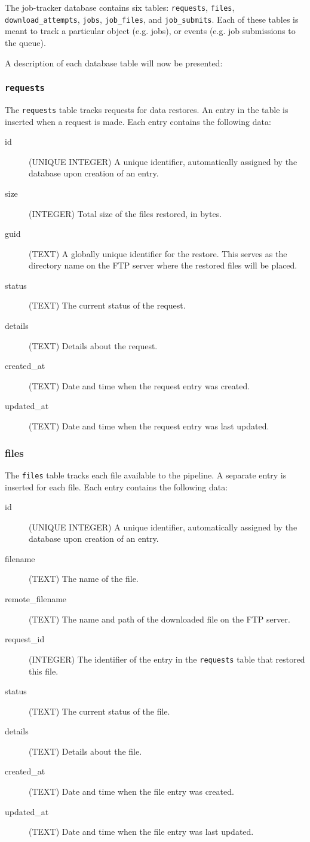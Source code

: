 The job-tracker database contains six tables: \texttt{requests}, \texttt{files}, \texttt{download\_attempts}, \texttt{jobs}, \texttt{job\_files}, and \texttt{job\_submits}. Each of these tables is meant to track a particular object (e.g. jobs), or events (e.g. job submissions to the queue).

A description of each database table will now be presented:

\subsubsection{\texttt{requests}}
The \texttt{requests} table tracks requests for data restores. An entry in the table is inserted when a request is made. Each entry contains the following data:
\begin{description}
    \item[id] (UNIQUE INTEGER) A unique identifier, automatically assigned by the database upon creation of an entry.
    \item[size] (INTEGER) Total size of the files restored, in bytes.
    \item[guid] (TEXT) A globally unique identifier for the restore. This serves as the directory name on the FTP server where the restored files will be placed.
    \item[status] (TEXT) The current status of the request.
    \item[details] (TEXT) Details about the request.
    \item[created\_at] (TEXT) Date and time when the request entry was created.
    \item[updated\_at] (TEXT) Date and time when the request entry was last updated.
\end{description}

\subsubsection{files}
The \texttt{files} table tracks each file available to the pipeline. A separate entry is inserted for each file. Each entry contains the following data:

\begin{description}
    \item[id] (UNIQUE INTEGER)  A unique identifier, automatically assigned by the database upon creation of an entry.
    \item[filename] (TEXT) The name of the file.
    \item[remote\_filename] (TEXT) The name and path of the downloaded file on the FTP server.
    \item[request\_id] (INTEGER) The identifier of the entry in the \texttt{requests} table that restored this file.
    \item[status] (TEXT) The current status of the file.
    \item[details] (TEXT) Details about the file.
    \item[created\_at] (TEXT) Date and time when the file entry was created.
    \item[updated\_at] (TEXT) Date and time when the file entry was last updated.
\end{description}

